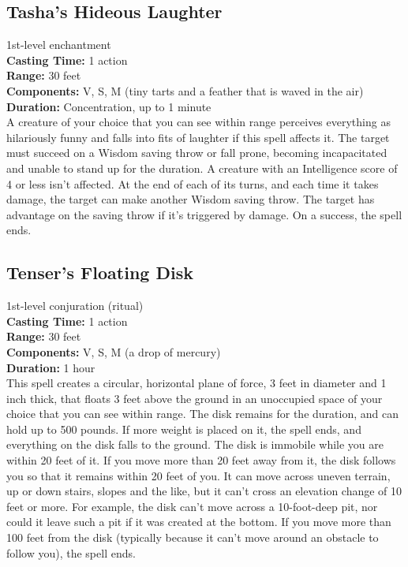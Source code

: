 \documentclass[11pt, A4paper, english]{article}
\begin{document}
		\subsection{Tasha's Hideous Laughter}
1st-level enchantment \\
\textbf{Casting Time:} 1 action \\
\textbf{Range:} 30 feet \\
\textbf{Components:} V, S, M (tiny tarts and a feather that is waved in the air) \\
\textbf{Duration:} Concentration, up to 1 minute \\
A creature of your choice that you can see within range perceives everything as hilariously funny and falls into fits of laughter if this spell affects it. The target must succeed on a Wisdom  saving throw or fall prone, becoming incapacitated and unable to stand up for the duration. A creature with an Intelligence score of 4 or less isn't affected. At the end of each of its turns, and each time it takes damage, the target can make another Wisdom  saving throw. The target has advantage on the saving throw if it's triggered by damage. On a success, the spell ends.

		\subsection{Tenser's Floating Disk}
1st-level conjuration (ritual) \\
\textbf{Casting Time:} 1 action \\
\textbf{Range:} 30 feet \\
\textbf{Components:} V, S, M (a drop of mercury) \\
\textbf{Duration:} 1 hour \\
This spell creates a circular, horizontal plane of force, 3 feet in diameter and 1 inch thick, that floats 3 feet above the ground in an unoccupied space of your choice that you can see within range. The disk remains for the duration, and can hold up to 500 pounds. If more weight is placed on it, the spell ends, and everything on the disk falls to the ground. The disk is immobile while you are within 20 feet of it. If you move more than 20 feet away from it, the disk follows you so that it remains within 20 feet of you. It can move across uneven terrain, up or down stairs, slopes and the like, but it can’t cross an elevation change of 10 feet or more. For example, the disk can’t move across a  10-foot-deep pit, nor could it leave such a pit if it was created at the bottom. If you move more than  100 feet from the disk (typically because it can’t move around an obstacle to follow you), the spell ends.
\end{document}
